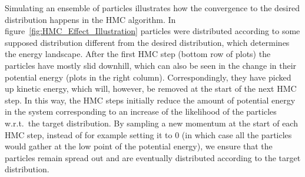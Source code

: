 Simulating an ensemble of particles illustrates how the convergence to the desired distribution happens in the HMC algorithm. In figure~\ref{fig:HMC_Effect_Illustration} particles were distributed according to some supposed distribution different from the desired distribution, which determines the energy landscape. After the first HMC step (bottom row of plots) the particles have mostly slid downhill, which can also be seen in the change in their potential energy (plots in the right column). Correspondingly, they have picked up kinetic energy, which will, however, be removed at the start of the next HMC step. In this way, the HMC steps initially reduce the amount of potential energy in the system corresponding to an increase of the likelihood of the particles w.r.t.\ the target distribution. By sampling a new momentum at the start of each HMC step, instead of for example setting it to 0 (in which case all the particles would gather at the low point of the potential energy), we ensure that the particles remain spread out and are eventually distributed according to the target distribution. 

